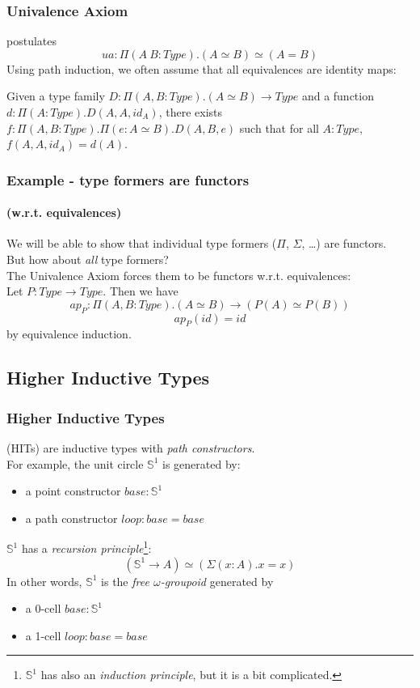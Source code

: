 \documentclass[dvipdfmx]{beamer}
\begin{document}
\begin{frame}
  \frametitle{Univalence Axiom}
  postulates
  \[
    ua : \Pi \left( A \ B : Type \right) .
    \left( A \simeq B \right) \simeq \left( A = B \right)
  \]
  \pause
  Using path induction,
  we often assume that all equivalences are identity maps:

  \begin{theorem}
    Given a type family
    $D : \Pi \left( A , B : Type \right) . \left( A \simeq B \right)
    \to Type$ and a function
    $d : \Pi \left( A : Type \right) . D \left( A , A , id_A \right)$,
    there exists
    $f : \Pi \left( A , B : Type \right) .
    \Pi \left( e : A \simeq B \right) .
    D \left( A , B , e \right)$ such that
    for all $A : Type$,
    $f \left( A , A , id_A \right) = d \left( A \right)$.
  \end{theorem}
\end{frame}

\begin{frame}
  \frametitle{Example - type formers are functors}
  \framesubtitle{(w.r.t. equivalences)}
  We will be able to show that
  individual type formers ($\Pi$, $\Sigma$, \dots) are functors.
  \pause
  \\
  But how about {\it all} type formers?
  \pause
  \\
  The Univalence Axiom forces them to be functors w.r.t. equivalences:
  \\
  Let $P : Type \to Type$.
  Then we have
  \[
    ap_P : \Pi \left( A , B : Type \right) .
    \left( A \simeq B \right) \to
    \left( P \left( A \right) \simeq P \left( B \right) \right)
  \]
  \[
    ap_P \left( id \right) = id
  \]
  by equivalence induction.
\end{frame}

\subsection{Higher Inductive Types}

\begin{frame}
  \frametitle{Higher Inductive Types}
  (HITs) are inductive types with {\it path constructors}. \\
  For example, the unit circle ${\mathbb S}^1$ is generated by:
  \begin{itemize}
      \pause
    \item a point constructor $base : {\mathbb S}^1$
      \pause
    \item a path constructor $loop : base = base$
  \end{itemize}
  \pause
  ${\mathbb S}^1$ has a {\it recursion principle}\footnote{
    ${\mathbb S}^1$ has also an {\it induction principle},
    but it is a bit complicated.}:
  \[
    \left( {\mathbb S}^1 \to A \right) \simeq
    \left( \Sigma \left( x : A \right) . x = x \right)
  \]
  In other words, ${\mathbb S}^1$ is the {\it free $\omega$-groupoid}
  generated by
  \begin{itemize}
    \item a 0-cell $base : {\mathbb S}^1$
    \item a 1-cell $loop : base = base$
  \end{itemize}
\end{frame}
\end{document}
